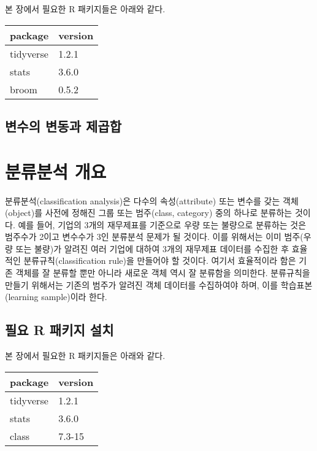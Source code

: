 \documentclass[]{book}
\begin{document}
본 장에서 필요한 R 패키지들은 아래와 같다.

\begin{tabular}{l|l}
\hline
package & version\\
\hline
tidyverse & 1.2.1\\
\hline
stats & 3.6.0\\
\hline
broom & 0.5.2\\
\hline
\end{tabular}

\hypertarget{pca-ss}{%
\section{변수의 변동과 제곱합}\label{pca-ss}}

\hypertarget{classification-analysis}{%
\chapter{분류분석 개요}\label{classification-analysis}}

분류분석(classification analysis)은 다수의 속성(attribute) 또는 변수를 갖는 객체(object)를 사전에 정해진 그룹 또는 범주(class, category) 중의 하나로 분류하는 것이다. 예를 들어, 기업의 3개의 재무제표를 기준으로 우량 또는 불량으로 분류하는 것은 범주수가 2이고 변수수가 3인 분류분석 문제가 될 것이다. 이를 위해서는 이미 범주(우량 또는 불량)가 알려진 여러 기업에 대하여 3개의 재무제표 데이터를 수집한 후 효율적인 분류규칙(classification rule)을 만들어야 할 것이다. 여기서 효율적이라 함은 기존 객체를 잘 분류할 뿐만 아니라 새로운 객체 역시 잘 분류함을 의미한다. 분류규칙을 만들기 위해서는 기존의 범주가 알려진 객체 데이터를 수집하여야 하며, 이를 학습표본(learning sample)이라 한다.

\hypertarget{classification-packages-install}{%
\section{필요 R 패키지 설치}\label{classification-packages-install}}

본 장에서 필요한 R 패키지들은 아래와 같다.

\begin{tabular}{l|l}
\hline
package & version\\
\hline
tidyverse & 1.2.1\\
\hline
stats & 3.6.0\\
\hline
class & 7.3-15\\
\hline
\end{tabular}
\end{document}
